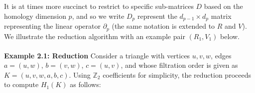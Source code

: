 \documentclass[sn-mathphys]{sn-jnl}
\begin{document}
 It is at times more succinct to restrict to specific sub-matrices $D$ based on the homology dimension $p$, and so we write $D_p$ represent the $d_{p-1} \times d_p$ matrix representing the linear operator $\partial_p$ (the same notation is extended to $R$ and $V$).
We illustrate the reduction algorithm with an example pair $(R_1, V_1)$ below. 
\\
\\
\noindent
\textbf{Example 2.1: Reduction} Consider a triangle with vertices $u,v,w$, edges $a = (u,w)$, $b = (v,w)$, $c = (u, v)$,
and whose filtration order is given as $K = (u, v, w, a, b, c)$. 
Using $\mathbb{Z}_2$ coefficients for simplicity, the reduction proceeds to compute $H_1(K)$ as follows:
\end{document}
